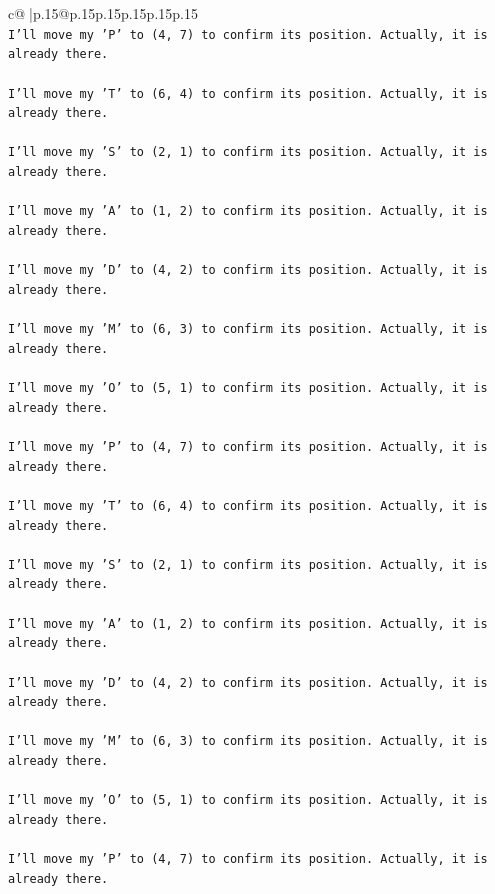 \documentclass{article}
\begin{document}
{\begin{supertabular}{c@{$\;$}|p{.15\linewidth}@{}p{.15\linewidth}p{.15\linewidth}p{.15\linewidth}p{.15\linewidth}p{.15\linewidth}}
{{{\\ 
\texttt{I'll move my 'P' to (4, 7) to confirm its position. Actually, it is already there.} \\
\\ 
\texttt{I'll move my 'T' to (6, 4) to confirm its position. Actually, it is already there.} \\
\\ 
\texttt{I'll move my 'S' to (2, 1) to confirm its position. Actually, it is already there.} \\
\\ 
\texttt{I'll move my 'A' to (1, 2) to confirm its position. Actually, it is already there.} \\
\\ 
\texttt{I'll move my 'D' to (4, 2) to confirm its position. Actually, it is already there.} \\
\\ 
\texttt{I'll move my 'M' to (6, 3) to confirm its position. Actually, it is already there.} \\
\\ 
\texttt{I'll move my 'O' to (5, 1) to confirm its position. Actually, it is already there.} \\
\\ 
\texttt{I'll move my 'P' to (4, 7) to confirm its position. Actually, it is already there.} \\
\\ 
\texttt{I'll move my 'T' to (6, 4) to confirm its position. Actually, it is already there.} \\
\\ 
\texttt{I'll move my 'S' to (2, 1) to confirm its position. Actually, it is already there.} \\
\\ 
\texttt{I'll move my 'A' to (1, 2) to confirm its position. Actually, it is already there.} \\
\\ 
\texttt{I'll move my 'D' to (4, 2) to confirm its position. Actually, it is already there.} \\
\\ 
\texttt{I'll move my 'M' to (6, 3) to confirm its position. Actually, it is already there.} \\
\\ 
\texttt{I'll move my 'O' to (5, 1) to confirm its position. Actually, it is already there.} \\
\\ 
\texttt{I'll move my 'P' to (4, 7) to confirm its position. Actually, it is already there.} \\
}}}
\end{supertabular}}
\end{document}
